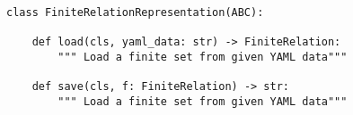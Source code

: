 \begin{verbatim}
class FiniteRelationRepresentation(ABC):

    def load(cls, yaml_data: str) -> FiniteRelation:
        """ Load a finite set from given YAML data"""

    def save(cls, f: FiniteRelation) -> str:
        """ Load a finite set from given YAML data"""
\end{verbatim}